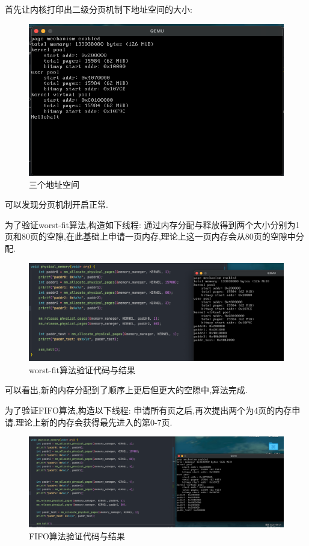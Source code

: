 首先让内核打印出二级分页机制下地址空间的大小:

\begin{figure}[H]
    \centering
    \includegraphics[width=\textwidth]{figures/page.png}
    \caption{三个地址空间}
    \label{fig:my_label}
\end{figure}

可以发现分页机制开启正常.

为了验证worst-fit算法,构造如下线程:
通过内存分配与释放得到两个大小分别为1页和80页的空隙,在此基础上申请一页内存,理论上这一页内存会从80页的空隙中分配.

\begin{figure}[H]
    \centering
    \includegraphics[width=\textwidth]{figures/wf_res.png}
    \caption{worst-fit算法验证代码与结果}
    \label{fig:my_label}
\end{figure}

可以看出,新的内存分配到了顺序上更后但更大的空隙中,算法完成.

为了验证FIFO算法,构造以下线程:
申请所有页之后,再次提出两个为4页的内存申请.理论上新的内存会获得最先进入的第0-7页.

\begin{figure}[H]
    \centering
    \includegraphics[width=\textwidth]{figures/fifo_res.png}
    \caption{FIFO算法验证代码与结果}
    \label{fig:my_label}
\end{figure}

